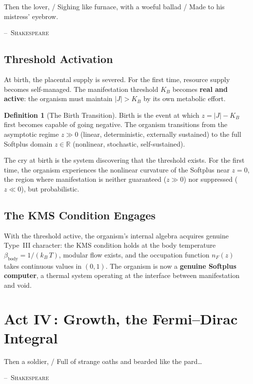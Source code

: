 \documentclass[12pt, letterpaper]{article}
\theoremstyle{plain}
\theoremstyle{definition}
\newtheorem{definition}[theorem]{Definition}
\theoremstyle{remark}
\newcommand{\KB}{K_{\!B}}                 %
\newcommand{\nF}{n_{\!F}}                 %
\newcommand{\Real}{\mathbb{R}}
\begin{document}
\epigraph{Then the lover, / Sighing like furnace, with a woeful ballad / Made to his mistress' eyebrow.}{\textsc{--~Shakespeare}}

\subsection{Threshold Activation}

At birth, the placental supply is severed. For the first time, resource supply becomes self-managed. The manifestation threshold $\KB$ becomes \textbf{real and active}: the organism must maintain $|J| > \KB$ by its own metabolic effort.

\begin{definition}[The Birth Transition]\label{def:birth}
  Birth is the event at which $z = |J| - \KB$ first becomes capable of going negative. The organism transitions from the asymptotic regime $z \gg 0$ (linear, deterministic, externally sustained) to the full Softplus domain $z \in \Real$ (nonlinear, stochastic, self-sustained).
\end{definition}

The cry at birth is the system discovering that the threshold exists. For the first time, the organism experiences the nonlinear curvature of the Softplus near $z = 0$, the region where manifestation is neither guaranteed ($z \gg 0$) nor suppressed ($z \ll 0$), but probabilistic.

\subsection{The KMS Condition Engages}

With the threshold active, the organism's internal algebra acquires genuine Type~III character: the KMS condition holds at the body temperature $\beta_{\text{body}} = 1/(k_{\!B}\,T)$, modular flow exists, and the occupation function $\nF(z)$ takes continuous values in $(0, 1)$. The organism is now a \textbf{genuine Softplus computer}, a thermal system operating at the interface between manifestation and void.


\section{\texorpdfstring{Act IV\,: Growth, the Fermi--Dirac Integral}{Act IV: Growth, the Fermi--Dirac Integral}}
\label{sec:act4}

\epigraph{Then a soldier, / Full of strange oaths and bearded like the pard\ldots}{\textsc{--~Shakespeare}}
\end{document}
